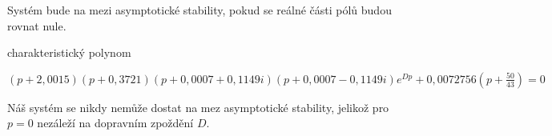 \documentclass{article}
\begin{document}
			 Systém bude na mezi asymptotické stability, pokud se reálné části pólů budou rovnat nule.
			  \begin{center}
			  charakteristický polynom
			  
			  \bigskip
			  
			  $(p+2,0015)(p+0,3721)(p+0,0007 + 0,1149i)(p+0,0007 - 0,1149i) e^{Dp}+0,0072756(p+\frac{50}{43})=0$
			  \end{center}
			  
			  Náš systém se nikdy nemůže dostat na mez asymptotické stability, jelikož pro $p=0$ nezáleží na dopravním zpoždění $D$.
\end{document}
